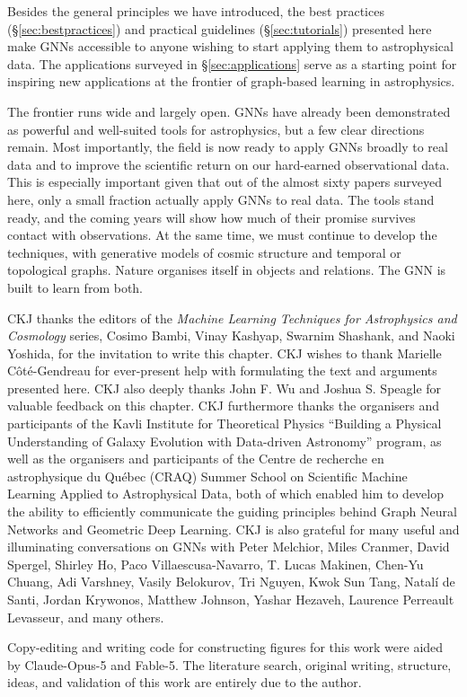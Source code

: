 \documentclass[graybox, envcountchap]{Template/svmult}
\newif\ifarxiv
\newcommand{\chapterorreview}{\ifarxiv review\else chapter\fi}%
\begin{document}
Besides the general principles we have introduced, the best practices (\S\ref{sec:bestpractices}) and practical guidelines (\S\ref{sec:tutorials}) presented here make GNNs accessible to anyone wishing to start applying them to astrophysical data. The applications surveyed in \S\ref{sec:applications} serve as a starting point for inspiring new applications at the frontier of graph-based learning in astrophysics.  

The frontier runs wide and largely open. GNNs have already been demonstrated as powerful and well-suited tools for astrophysics, but a few clear directions remain. Most importantly, the field is now ready to apply GNNs broadly to real data and to improve the scientific return on our hard-earned observational data. This is especially important given that out of the almost sixty papers surveyed here, only a small fraction actually apply GNNs to real data. The tools stand ready, and the coming years will show how much of their promise survives contact with observations. At the same time, we must continue to develop the techniques, with generative models of cosmic structure and temporal or topological graphs. Nature organises itself in objects and relations. The GNN is built to learn from both.




\begin{acknowledgement}

CKJ thanks the editors of the \textit{Machine Learning Techniques for Astrophysics and Cosmology} series, Cosimo Bambi, Vinay Kashyap, Swarnim Shashank, and Naoki Yoshida, for the invitation to write this \chapterorreview{}. CKJ wishes to thank Marielle Côté-Gendreau for ever-present help with formulating the text and arguments presented here. CKJ also deeply thanks John F. Wu and Joshua S. Speagle for valuable feedback on this \chapterorreview{}. CKJ furthermore thanks the organisers and participants of the Kavli Institute for Theoretical Physics ``Building a Physical Understanding of Galaxy Evolution with Data-driven Astronomy'' program, as well as the organisers and participants of the Centre de recherche en astrophysique du Québec (CRAQ) Summer School on Scientific Machine Learning Applied to Astrophysical Data, both of which enabled him to develop the ability to efficiently communicate the guiding principles behind Graph Neural Networks and Geometric Deep Learning. CKJ is also grateful for many useful and illuminating conversations on GNNs with Peter Melchior, Miles Cranmer, David Spergel, Shirley Ho, Paco Villaescusa-Navarro, T. Lucas Makinen, Chen-Yu Chuang, Adi Varshney, Vasily Belokurov, Tri Nguyen, Kwok Sun Tang, Natalí de Santi, Jordan Krywonos, Matthew Johnson, Yashar Hezaveh, Laurence Perreault Levasseur, and many others.

Copy-editing and writing code for constructing figures for this work were aided by Claude-Opus-5 and Fable-5. The literature search, original writing, structure, ideas, and validation of this work are entirely due to the author.
\end{acknowledgement}
\end{document}
